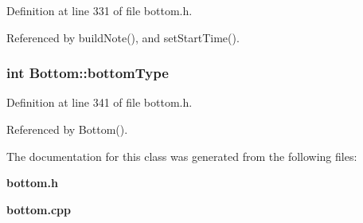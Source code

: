 Definition at line 331 of file bottom.h.

Referenced by build\-Note(), and set\-Start\-Time().
\subsubsection{\setlength{\rightskip}{0pt plus 5cm}int {\bf Bottom::bottom\-Type}\hspace{0.3cm}{\tt  [protected]}}\label{classBottom_p3}




Definition at line 341 of file bottom.h.

Referenced by Bottom().

The documentation for this class was generated from the following files:\begin{CompactItemize}
\item 
{\bf bottom.h}\item 
{\bf bottom.cpp}\end{CompactItemize}
